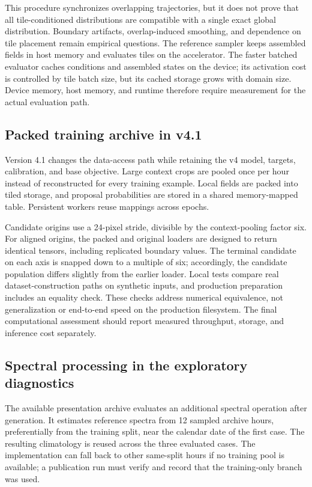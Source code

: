 \documentclass[10pt]{article}
\begin{document}
This procedure synchronizes overlapping trajectories, but it does not prove that all tile-conditioned distributions are compatible with a single exact global distribution. Boundary artifacts, overlap-induced smoothing, and dependence on tile placement remain empirical questions. The reference sampler keeps assembled fields in host memory and evaluates tiles on the accelerator. The faster batched evaluator caches conditions and assembled states on the device; its activation cost is controlled by tile batch size, but its cached storage grows with domain size. Device memory, host memory, and runtime therefore require measurement for the actual evaluation path.

\subsection{Packed training archive in v4.1}
Version 4.1 changes the data-access path while retaining the v4 model, targets, calibration, and base objective. Large context crops are pooled once per hour instead of reconstructed for every training example. Local fields are packed into tiled storage, and proposal probabilities are stored in a shared memory-mapped table. Persistent workers reuse mappings across epochs.

Candidate origins use a 24-pixel stride, divisible by the context-pooling factor six. For aligned origins, the packed and original loaders are designed to return identical tensors, including replicated boundary values. The terminal candidate on each axis is snapped down to a multiple of six; accordingly, the candidate population differs slightly from the earlier loader. Local tests compare real dataset-construction paths on synthetic inputs, and production preparation includes an equality check. These checks address numerical equivalence, not generalization or end-to-end speed on the production filesystem. The final computational assessment should report measured throughput, storage, and inference cost separately.

\subsection{Spectral processing in the exploratory diagnostics}\label{sec:spectral}
The available presentation archive evaluates an additional spectral operation after generation. It estimates reference spectra from 12 sampled archive hours, preferentially from the training split, near the calendar date of the first case. The resulting climatology is reused across the three evaluated cases. The implementation can fall back to other same-split hours if no training pool is available; a publication run must verify and record that the training-only branch was used.
\end{document}
